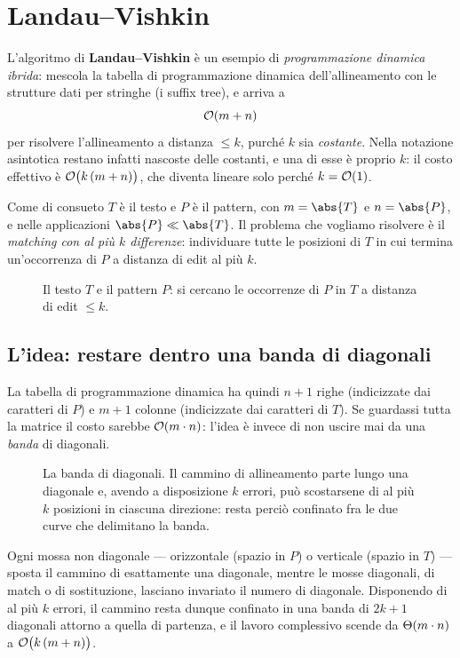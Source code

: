 \chapter{Landau--Vishkin}

L'algoritmo di \textbf{Landau--Vishkin} è un esempio di \emph{programmazione
dinamica ibrida}: mescola la tabella di programmazione dinamica
dell'allineamento con le strutture dati per stringhe (i suffix tree), e arriva a
\[
  \mathcal{O}(m+n)
\]
per risolvere l'allineamento a distanza $\le k$, purché $k$ sia
\emph{costante}. Nella notazione asintotica restano infatti nascoste delle
costanti, e una di esse è proprio $k$: il costo effettivo è
$\mathcal{O}\bigl(k\,(m+n)\bigr)$, che diventa lineare solo perché $k=\mathcal{O}(1)$.

Come di consueto $T$ è il testo e $P$ è il pattern, con $m=\abs{T}$ e
$n=\abs{P}$, e nelle applicazioni $\abs{P}\ll\abs{T}$. Il problema che vogliamo
risolvere è il \emph{matching con al più $k$ differenze}: individuare tutte le
posizioni di $T$ in cui termina un'occorrenza di $P$ a distanza di edit al
più $k$.

\begin{figure}[H]
  \centering
  
  \caption{Il testo $T$ e il pattern $P$: si cercano le occorrenze di $P$ in $T$
  a distanza di edit $\le k$.}
  \label{fig:lv-testo-pattern}
\end{figure}

\section{L'idea: restare dentro una banda di diagonali}

La tabella di programmazione dinamica ha quindi $n+1$ righe (indicizzate dai
caratteri di $P$) e $m+1$ colonne (indicizzate dai caratteri di $T$). Se
guardassi tutta la matrice il costo sarebbe $\mathcal{O}(m\cdot n)$: l'idea è invece di
non uscire mai da una \emph{banda} di diagonali.

\begin{figure}[H]
  \centering
  
  \caption{La banda di diagonali. Il cammino di allineamento parte lungo una
  diagonale e, avendo a disposizione $k$ errori, può scostarsene di al più $k$
  posizioni in ciascuna direzione: resta perciò confinato fra le due curve che
  delimitano la banda.}
  \label{fig:lv-banda-diagonali}
\end{figure}

Ogni mossa non diagonale --- orizzontale (spazio in $P$) o verticale (spazio in
$T$) --- sposta il cammino di esattamente una diagonale, mentre le mosse
diagonali, di match o di sostituzione, lasciano invariato il numero di
diagonale. Disponendo di al più $k$ errori, il cammino resta dunque confinato in
una banda di $2k+1$ diagonali attorno a quella di partenza, e il lavoro
complessivo scende da $\Theta(m\cdot n)$ a $\mathcal{O}\bigl(k\,(m+n)\bigr)$.

